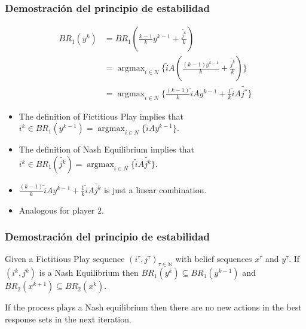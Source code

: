 \documentclass[handout, pdf]{beamer}
\newcommand{\pstrat}{\widetilde}
\DeclareMathOperator*{\argmax}{argmax}
\begin{document}
\begin{frame}
    \frametitle{Demostración del principio de estabilidad}
    \begin{align*}
        BR_1(y^k) &= BR_1(\frac{k - 1}{k} y^{k-1} + \frac{ \pstrat{j^k}}{k}) \\
        &= \argmax_{i \in N} \{\pstrat{i} A(\frac{(k - 1)y^{k-1}}{k} + \frac{ \pstrat{j^k}}{k})\}\\
        &= \argmax_{i \in N} \{\frac{(k - 1)}{k}\pstrat{i} Ay^{k-1} + \frac{1}{k}\pstrat{i} A \pstrat{j^*}\}
    \end{align*}
    \begin{itemize}
        \item \pause The definition of Fictitious Play implies that $i^k \in BR_1(y^{k-1}) = \argmax_{i \in N}\{\pstrat{i}Ay^{k-1}\}$.
        \item \pause The definition of Nash Equilibrium implies that $i^k \in BR_1(\pstrat{j^k}) = \argmax_{i \in N}\{\pstrat{i} A \pstrat{j^k}\}$.
        \item \pause $\frac{(k - 1)}{k}\pstrat{i}Ay^{k-1} + \frac{1}{k}\pstrat{i} A \pstrat{j^k}$ is just a linear combination.
        \item \pause Analogous for player 2.
    \end{itemize}
\end{frame}

\begin{frame}
    \frametitle{Demostración del principio de estabilidad}
    \begin{lemma}[2]
        Given a Fictitious Play sequence $(i^\tau, j^\tau)_{\tau \in \mathbb{N}}$ with belief sequences $x^\tau$ and $y^\tau$. If $(i^k, j^k)$ is a Nash Equilibrium then $BR_1(y^{k}) \subseteq BR_1(y^{k-1})$ and $BR_2(x^{k+1}) \subseteq BR_2(x^{k})$.
    \end{lemma}
    \pause If the process plays a Nash equilibrium then there are no new actions in the best response sets in the next iteration.
\end{frame}
\end{document}
